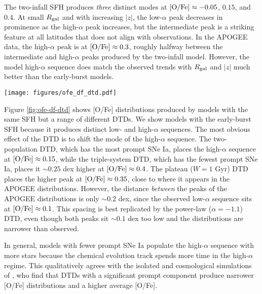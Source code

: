 \documentclass[twocolumn,twocolappendix]{aastex631}
\begin{document}
The two-infall SFH produces \textit{three} distinct modes at ${\rm [O/Fe]}\approx -0.05$, $0.15$, and $0.4$. At small $R_{\rm gal}$ and with increasing $|z|$, the low-$\alpha$ peak decreases in prominence as the high-$\alpha$ peak increases, but the intermediate peak is a striking feature at all latitudes that does not align with observations. In the APOGEE data, the high-$\alpha$ peak is at ${\rm [O/Fe]}\approx0.3$, roughly halfway between the intermediate and high-$\alpha$ peaks produced by the two-infall model. However, the model high-$\alpha$ sequence does match the observed trends with $R_{\rm gal}$ and $|z|$ much better than the early-burst models.

\begin{figure*}
    \centering
    \texttt{[image: figures/ofe\_df\_dtd.pdf]}
    \caption{The same as Figure \ref{fig:ofe-df-sfh} but for different DTDs. In all cases an early-burst SFH is assumed.}
    \label{fig:ofe-df-dtd}
\end{figure*}

Figure \ref{fig:ofe-df-dtd} shows [O/Fe] distributions produced by models with the same SFH but a range of different DTDs. We show models with the early-burst SFH because it produces distinct low- and high-$\alpha$ sequences. The most obvious effect of the DTD is to shift the mode of the high-$\alpha$ sequence. The two-population DTD, which has the most prompt SNe Ia, places the high-$\alpha$ sequence at ${\rm [O/Fe]}\approx 0.15$, while the triple-system DTD, which has the fewest prompt SNe Ia, places it $\sim0.25$ dex higher at ${\rm [O/Fe]}\approx0.4$. The plateau ($W=1$ Gyr) DTD places the higher peak at ${\rm [O/Fe]}\approx0.35$, close to where it appears in the APOGEE distributions. However, the distance {\it between} the peaks of the APOGEE distributions is only $\sim0.2$ dex, since the observed low-$\alpha$ sequence sits at ${\rm [O/Fe]}\approx0.1$. This spacing is best replicated by the power-law ($\alpha=-1.1$) DTD, even though both peaks sit $\sim0.1$ dex too low and the distributions are narrower than observed. 

In general, models with fewer prompt SNe Ia populate the high-$\alpha$ sequence with more stars because the chemical evolution track spends more time in the high-$\alpha$ regime. This qualitatively agrees with the isolated and cosmological simulations of \citet{Poulhazan2018-PrecisionPollution}, who find that DTDs with a significant prompt component produce narrower [O/Fe] distributions and a higher average [O/Fe].
\end{document}
